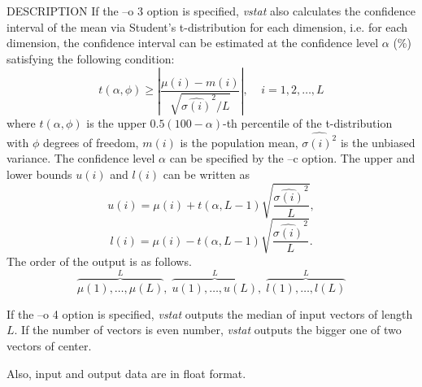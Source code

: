\begin{qsection}{DESCRIPTION}
If the --o 3 option is specified, {\em vstat} also calculates the confidence
interval of the mean via Student's t-distribution for each dimension,
i.e. for each dimension, the confidence interval can be estimated
at the confidence level $\alpha$ (\%) satisfying the following condition:
 \begin{displaymath}
  t(\alpha, \phi) \geq
  \left| \frac{\mu(i) -m(i)}{\sqrt{\hat{\sigma(i)}^{2} / L} }\right|
  ,   \;\;\;\; i = 1,  2, \dots, L
 \end{displaymath}
where $t(\alpha, \phi)$ is the upper $0.5(100 - \alpha)$-th percentile
of the t-distribution with $\phi$ degrees of freedom,
$m(i)$ is the population mean, $\hat{\sigma(i)^{2}}$ is the unbiased variance.
The confidence level $\alpha$ can be specified by the --c option.
The upper and lower bounds $u(i)$ and $l(i)$ can be written as
 \begin{displaymath}
  u(i) = \mu(i) + t(\alpha, L - 1) \sqrt{\frac{\hat{\sigma(i)}^{2}}{L}},
 \end{displaymath}
 \begin{displaymath}
  l(i) = \mu(i) - t(\alpha, L - 1) \sqrt{\frac{\hat{\sigma(i)}^{2}}{L}}.
 \end{displaymath}
The order of the output is as follows.
 \begin{displaymath}
  \overbrace{\mu(1),\dots,\mu(L)}^L, \; \overbrace{u(1),\dots,u(L)}^L,
    \;\overbrace{l(1),\dots,l(L)}^L
 \end{displaymath}

If the --o 4 option is specified, {\em vstat} outputs the median of 
input vectors of length $L$.
If the number of vectors is even number, {\em vstat} outputs the
bigger one of two vectors of center.
 

Also, input and output data are in float format.
\end{qsection}

\begin{options}
\end{options}

